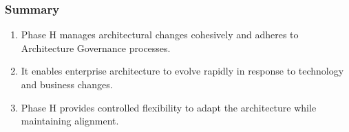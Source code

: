 \documentclass[aspectratio=169, table]{beamer}
\begin{document}
	\begin{frame}
		\frametitle{Summary}
		\begin{enumerate}
			\item Phase H manages architectural changes cohesively and adheres to Architecture Governance processes.
			\item It enables enterprise architecture to evolve rapidly in response to technology and business changes.
			\item Phase H provides controlled flexibility to adapt the architecture while maintaining alignment.
		\end{enumerate}
	\end{frame}
\end{document}
